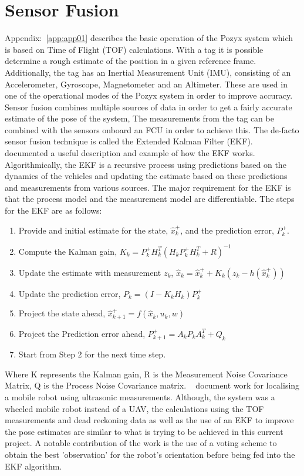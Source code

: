 \section{Sensor Fusion}\label{sec:sensor_fusion}
Appendix:~\ref{app:app01} describes the basic operation of the Pozyx system which is based on Time of Flight (TOF) calculations.
With a tag it is possible determine a rough estimate of the position in a given reference frame.
Additionally, the tag has an Inertial Measurement Unit (IMU), consisting of an Accelerometer, Gyroscope, Magnetometer and an Altimeter.
These are used in one of the operational modes of the Pozyx system in order to improve accuracy.
Sensor fusion combines multiple sources of data in order to get a fairly accurate estimate of the pose of the system,
The measurements from the tag can be combined with the sensors onboard an FCU in order to achieve this.
The de-facto sensor fusion technique is called the Extended Kalman Filter (EKF).
~\citet{simpleekf} documented a useful description and example of how the EKF works.
Algorithmically, the EKF is a recursive process using predictions based on the dynamics of the vehicles and updating the estimate based on these predictions and measurements from various sources.
The major requirement for the EKF is that the process model and the measurement model are differentiable.
The steps for the EKF are as follows:
\begin{enumerate}
    \item Provide and initial estimate for the state, $\hat{x}^+_k$, and the prediction error, $P^+_k$.
    \item Compute the Kalman gain, $K_k = P^+_{k}H_k^T(H_k P^+_{k}H_k^T + R)^{-1}$
    \item Update the estimate with measurement $z_k$, $\hat{x}_k=\hat{x}^+_k + K_k(z_k - h(\hat{x}^+_k))$
    \item Update the prediction error, $P_k = (I - K_k H_k)P^+_{k}$
    \item Project the state ahead, $\hat{x}^+_{k+1} = f(\hat{x}_k, u_k, w)$
    \item Project the Prediction error ahead, $P^+_{k+1} = A_k P_k A_k^T + Q_k$
    \item Start from Step 2 for the next time step.
\end{enumerate}
Where K represents the Kalman gain, R is the Measurement Noise Covariance Matrix, Q is the Process Noise Covariance matrix.
~\citet{tsai1998localization} document work for localising a mobile robot using ultrasonic measurements.
Although, the system was a wheeled mobile robot instead of a UAV, the calculations using the TOF measurements and dead reckoning data as well as the use of an EKF to improve the pose estimates are similar to what is trying to be achieved in this current project.
A notable contribution of the work is the use of a voting scheme to obtain the best 'observation' for the robot's orientation before being fed into the EKF algorithm.



